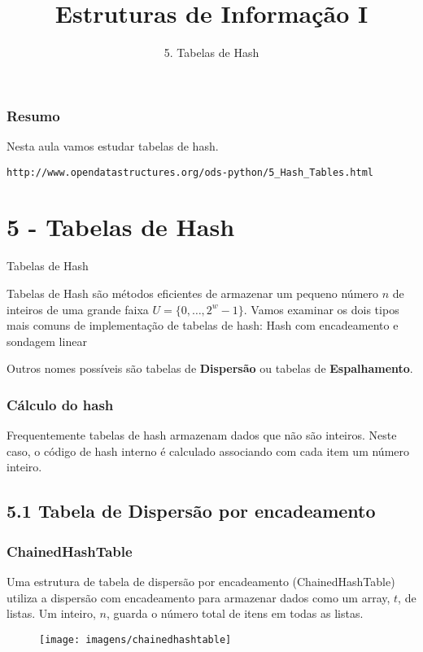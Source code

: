 \documentclass{beamer}
\title[\sc{Estruturas de Informação I}]{Estruturas de Informação I}
\subtitle{5. Tabelas de Hash}
\begin{document}
\begin{frame}
  \titlepage
\end{frame}

\begin{frame}
	\frametitle{Resumo}
	Nesta aula vamos estudar tabelas de hash.
	
	{\footnotesize \texttt{http://www.opendatastructures.org/ods-python/5\_Hash\_Tables.html}}
	\tableofcontents
\end{frame}

\section{5 - Tabelas de Hash}
\begin{frame}
	\LARGE{\alert{Tabelas de Hash}}
	
	\normalsize
	 Tabelas de Hash são métodos eficientes de armazenar um pequeno número $n$ de inteiros de uma grande faixa  $U=\{0,\ldots,2^w-1\}$. Vamos examinar os dois tipos mais comuns de implementação de tabelas de hash: Hash com encadeamento e sondagem linear
	 
	 Outros nomes possíveis são tabelas de \textbf{Dispersão} ou tabelas de \textbf{Espalhamento}.
	
\end{frame}

\begin{frame}
\frametitle{Cálculo do hash}

Frequentemente tabelas de hash armazenam dados que não são inteiros. Neste caso, o código de hash interno é calculado associando com cada item um número inteiro.	

\end{frame}

\subsection{5.1 Tabela de Dispersão por encadeamento}
\begin{frame}
\frametitle{ChainedHashTable}
Uma estrutura de tabela de dispersão por encadeamento (ChainedHashTable) utiliza a dispersão com encadeamento para armazenar dados como um array, $t$, de listas. Um inteiro, $n$, guarda o número total de itens em todas as listas.

\begin{figure}
\texttt{[image: imagens/chainedhashtable]}
\end{figure}

\end{frame}
\end{document}
